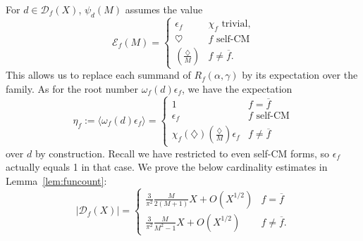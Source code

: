 \documentclass[11pt,reqno]{amsart} \usepackage{fullpage}
\newcommand{\ep}{\epsilon}
\newcommand\be{\begin{equation}}
\newcommand\ee{\end{equation}}
\newcommand{\D}{\mathcal D_f}
\newcommand{\E}{\mathcal E_f}
\numberwithin{equation}{section}
\begin{document}
For $d\in\D(X)$, $\psi_d(M)$ assumes the value
\be\E(M)=\begin{cases}
  \ep_f&\chi_f\text{ trivial,} \\
  \heartsuit&\text{$f$ self-CM} \\
  \left(\frac\diamondsuit M\right)&f\ne\overline f.\end{cases}\ee
This allows us to replace each summand of $R_f(\alpha,\gamma)$ by its expectation over
the family. As for the root number $\omega_f(d)\ep_f$, we have the expectation
\be\label{eq:rootexpect}
\eta_f:=\langle\omega_f(d)\ep_f\rangle=\begin{cases}1&f=\overline f \\
  \ep_f&\text{$f$ self-CM}\\
  \chi_f(\diamondsuit)\left(\frac\diamondsuit M\right)\ep_f&f\ne\overline f\end{cases}\ee
over $d$ by construction.
Recall we have restricted to even self-CM forms, so $\ep_f$ actually equals 1 in that
case. We prove the below cardinality estimates in Lemma~\ref{lem:funcount}:
\be\label{eq:cardest}\left|\D(X)\right|=
\begin{cases}
  \frac3{\pi^2}\frac M{2(M+1)}X+O\left(X^{1/2}\right)&f=\overline f \\
  \frac3{\pi^2}\frac M{M^2-1}X+O\left(X^{1/2}\right)&f\ne\overline f.
\end{cases}\ee
\end{document}
